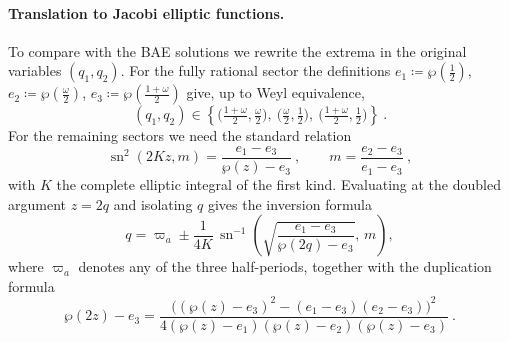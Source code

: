 \documentclass[aps, prx, nofootinbib, twocolumn,amsfonts,amsmath,amssymb,mathtools,superscriptaddress,preprintnumbers,floatfix,reprint]{revtex4-2}
\DeclareMathOperator{\sn}{sn}
\begin{document}
\paragraph{Translation to Jacobi elliptic functions.}
To compare with the BAE solutions we rewrite the extrema in the original
variables $(q_1,q_2)$. For the fully rational sector the definitions
$e_1\coloneqq\wp(\tfrac12)$, $e_2\coloneqq\wp(\tfrac{\omega}{2})$,
$e_3\coloneqq\wp(\tfrac{1+\omega}{2})$ give, up to Weyl equivalence,
\begin{equation}\label{eq:B2CMfullyrational}
  (q_1,q_2) \in \left\{ \Big(\tfrac{1+\omega}{2},\tfrac{\omega}{2}\Big),\
  \Big(\tfrac{\omega}{2},\tfrac12\Big),\
  \Big(\tfrac{1+\omega}{2},\tfrac12\Big)\right\} \ .
\end{equation}
For the remaining sectors we need the standard relation
\begin{equation}
  \sn^2(2Kz,m)=\frac{e_1-e_3}{\wp(z)-e_3}\ ,
  \qquad m=\frac{e_2-e_3}{e_1-e_3}\ ,
\end{equation}
with $K$ the complete elliptic integral of the first kind. Evaluating at the
doubled argument $z=2q$ and isolating $q$ gives the inversion formula
\begin{equation}
  q=\varpi_a\pm\frac{1}{4K}\,\sn^{-1}
  \left(\sqrt{\frac{e_1-e_3}{\wp(2q)-e_3}},\,m\right),
\end{equation}
where $\varpi_a$ denotes any of the three half-periods, together with the
duplication formula
\begin{equation}
  \wp(2z)-e_3=\frac{\big((\wp(z)-e_3)^2-(e_1-e_3)(e_2-e_3)\big)^2}
  {4(\wp(z)-e_1)(\wp(z)-e_2)(\wp(z)-e_3)}\ .
\end{equation}
\end{document}
